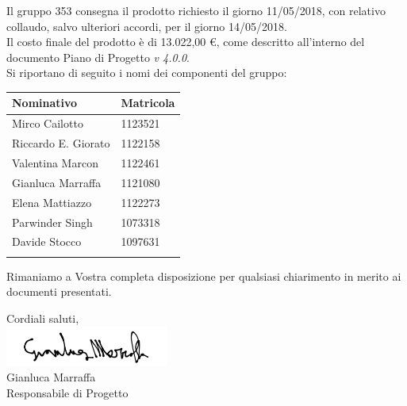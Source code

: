 \documentclass[openany, a4paper, 12pt]{letter}
\newcommand{\Valentina}{Valentina Marcon\xspace}
\newcommand{\Mirco}{Mirco Cailotto\xspace}
\newcommand{\Riccardo}{Riccardo E. Giorato\xspace}
\newcommand{\Davide}{Davide Stocco\xspace}
\newcommand{\Parwinder}{Parwinder Singh\xspace}
\newcommand{\Elena}{Elena Mattiazzo\xspace}
\newcommand{\Gianluca}{Gianluca Marraffa\xspace}
\newcommand{\vrquattro}{\textit{v 4.0.0}\xspace} %
\begin{document}
\begin{letter}
		Il gruppo 353 consegna il prodotto richiesto il giorno 11/05/2018,
		con relativo collaudo, salvo ulteriori accordi, per il giorno 14/05/2018.\\
		Il costo finale del prodotto è di 13.022,00 \euro, come descritto all'interno del documento Piano di Progetto \vrquattro.
		\medskip \\
		Si riportano di seguito i nomi dei componenti del gruppo:\\
		
		\renewcommand*{\arraystretch}{1.2}
		\begin{longtable}[H]{p{6cm}p{2.5cm}}
			\rowcolor{CHeader}   
			\color{CHeaderText} \textbf{Nominativo} & \color{CHeaderText} \textbf{Matricola}\\
			\endhead
			\Mirco & 1123521 \\
			\Riccardo & 1122158 \\
			\Valentina & 1122461 \\
			\Gianluca & 1121080 \\
			\Elena & 1122273 \\
			\Parwinder & 1073318 \\
			\Davide & 1097631 \\
			\hiderowcolors
		\end{longtable}
		
		Rimaniamo a Vostra completa disposizione per qualsiasi chiarimento in merito ai documenti presentati.
		\begin{flushleft}
			Cordiali saluti,\\
			\includegraphics[width=0.4\textwidth]{firmaResp}\\
			\Gianluca \\
			Responsabile di Progetto\\
		\end{flushleft}
	\end{letter}
\end{document}
